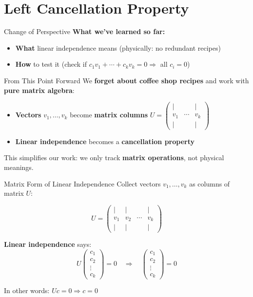 \documentclass[10pt]{beamer}
\theoremstyle{definition}
\newcommand{\x}[1]{\alert{\textbf{#1}}}
\begin{document}
\section{Left Cancellation Property}

\begin{frame}{Change of Perspective}
\textbf{What we've learned so far:}
\begin{itemize}
\item \x{What} linear independence means (physically: no redundant recipes)
\item \x{How} to test it (check if $c_1v_1 + \cdots + c_k v_k = 0 \Rightarrow$ all $c_i = 0$)
\end{itemize}

\vfill
\begin{alertblock}{From This Point Forward}
We \x{forget about coffee shop recipes} and work with \x{pure matrix algebra}:
\begin{itemize}
\item \textbf{Vectors} $v_1, \ldots, v_k$ become \textbf{matrix columns} $U = \begin{pmatrix} | & & | \\ v_1 & \cdots & v_k \\ | & & | \end{pmatrix}$
\item \textbf{Linear independence} becomes a \textbf{cancellation property}
\end{itemize}
\end{alertblock}

This simplifies our work: we only track \x{matrix operations}, not physical meanings.
\end{frame}

\begin{frame}{Matrix Form of Linear Independence}
Collect vectors $v_1, \ldots, v_k$ as columns of matrix $U$:

$$U = \begin{pmatrix} | & | & & | \\ v_1 & v_2 & \cdots & v_k \\ | & | & & | \end{pmatrix}$$

\vfill
\x{Linear independence} says:
$$U \begin{pmatrix} c_1 \\ c_2 \\ \vdots \\ c_k \end{pmatrix} = 0 \quad \Rightarrow \quad \begin{pmatrix} c_1 \\ c_2 \\ \vdots \\ c_k \end{pmatrix} = 0$$

In other words: $Uc = 0 \Rightarrow c = 0$
\end{frame}
\end{document}
